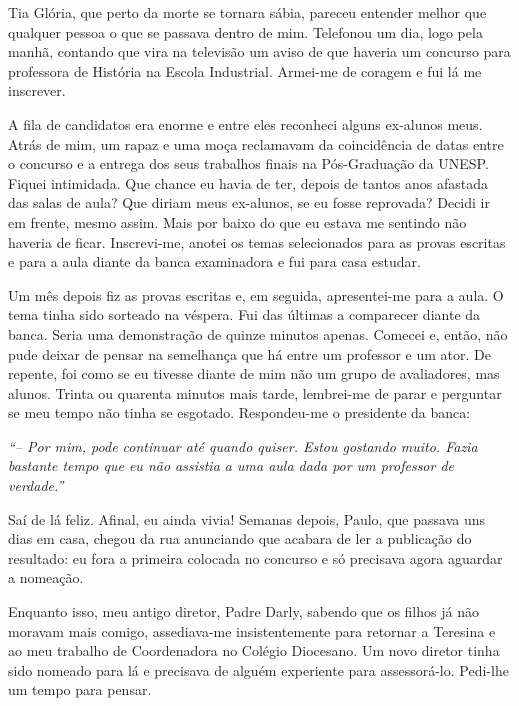 Tia Glória, que perto da morte se tornara sábia, pareceu entender melhor que qualquer pessoa o que se passava dentro de mim.
Telefonou um dia, logo pela manhã, contando que vira na televisão um aviso de que haveria um concurso para professora de História na Escola Industrial.
Armei-me de coragem e fui lá me inscrever.

A fila de candidatos era enorme e entre eles reconheci alguns ex-alunos meus.
Atrás de mim, um rapaz e uma moça reclamavam da coincidência de datas entre o concurso e a entrega dos seus trabalhos finais na Pós-Graduação da UNESP.
Fiquei intimidada.
Que chance eu havia de ter, depois de tantos anos afastada das salas de aula? Que diriam meus ex-alunos, se eu fosse reprovada? Decidi ir em frente, mesmo assim.
Mais por baixo do que eu estava me sentindo não haveria de ficar.
Inscrevi-me, anotei os temas selecionados para as provas escritas e para a aula diante da banca examinadora e fui para casa estudar.

Um mês depois fiz as provas escritas e, em seguida, apresentei-me para a aula.
O tema tinha sido sorteado na véspera.
Fui das últimas a comparecer diante da banca.
Seria uma demonstração de quinze minutos apenas.
Comecei e, então, não pude deixar de pensar na semelhança que há entre um professor e um ator.
De repente, foi como se eu tivesse diante de mim não um grupo de avaliadores, mas alunos.
Trinta ou quarenta minutos mais tarde, lembrei-me de parar e perguntar se meu tempo não tinha se esgotado.
Respondeu-me o presidente da banca:

\textit{``-- Por mim, pode continuar até quando quiser.
Estou gostando muito.
Fazia bastante tempo que eu não assistia a uma aula dada por um professor de verdade.''}

Saí de lá feliz.
Afinal, eu ainda vivia! Semanas depois, Paulo, que passava uns dias em casa, chegou da rua anunciando que acabara de ler a publicação do resultado: eu fora a primeira colocada no concurso e só precisava agora aguardar a nomeação.

Enquanto isso, meu antigo diretor, Padre Darly, sabendo que os filhos já não moravam mais comigo, assediava-me insistentemente para retornar a Teresina e ao meu trabalho de Coordenadora no Colégio Diocesano.
Um novo diretor tinha sido nomeado para lá e precisava de alguém experiente para assessorá-lo.
Pedi-lhe um tempo para pensar.

